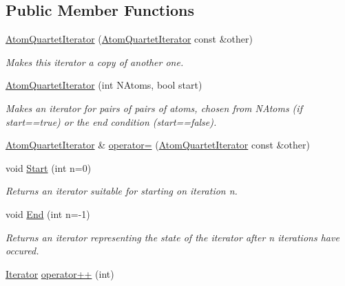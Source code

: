 \subsection*{Public Member Functions}
\begin{DoxyCompactItemize}
\item 
\hyperlink{classJKBuilder_1_1AtomQuartetIterator_ab6c4f20fcdd55b5e65bd25fd0ffa6aab}{AtomQuartetIterator} (\hyperlink{classJKBuilder_1_1AtomQuartetIterator}{AtomQuartetIterator} const \&other)
\begin{DoxyCompactList}\small\item\em Makes this iterator a copy of another one. \item\end{DoxyCompactList}\item 
\hyperlink{classJKBuilder_1_1AtomQuartetIterator_a9cf8914af3c8623ae212e03307e27195}{AtomQuartetIterator} (int NAtoms, bool start)
\begin{DoxyCompactList}\small\item\em Makes an iterator for pairs of pairs of atoms, chosen from NAtoms (if start==true) or the end condition (start==false). \item\end{DoxyCompactList}\item 
\hyperlink{classJKBuilder_1_1AtomQuartetIterator}{AtomQuartetIterator} \& \hyperlink{classJKBuilder_1_1AtomQuartetIterator_a39f50a07009d2e9e81e1d64da594084f}{operator=} (\hyperlink{classJKBuilder_1_1AtomQuartetIterator}{AtomQuartetIterator} const \&other)
\item 
void \hyperlink{classJKBuilder_1_1QuartetIterator_a34ca36a99b20ae3170babadaffe51ed2}{Start} (int n=0)
\begin{DoxyCompactList}\small\item\em Returns an iterator suitable for starting on iteration n. \item\end{DoxyCompactList}\item 
void \hyperlink{classJKBuilder_1_1QuartetIterator_a5f692b73d2e160450f4617bb75825e11}{End} (int n=-\/1)
\begin{DoxyCompactList}\small\item\em Returns an iterator representing the state of the iterator after n iterations have occured. \item\end{DoxyCompactList}\item 
\hyperlink{classJKBuilder_1_1Iterator}{Iterator} \hyperlink{classJKBuilder_1_1Iterator_ac1702aedba13b4112b891b58dfd78eba}{operator++} (int)

\end{DoxyCompactItemize}
